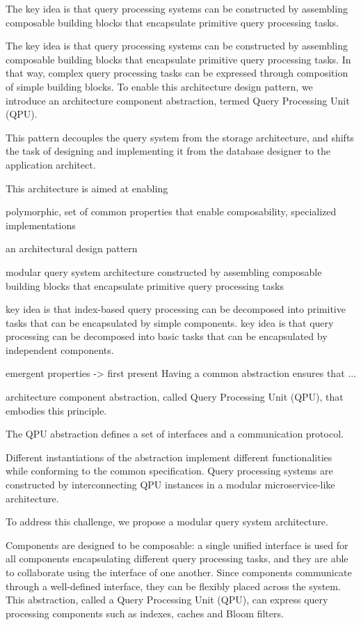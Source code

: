 The key idea is that query processing systems can be constructed by assembling composable building blocks that
encapsulate primitive query processing tasks.

The key idea is that query processing systems can be constructed by assembling composable building blocks that
encapsulate primitive query processing tasks.
In that way, complex query processing tasks can be expressed through composition of simple building blocks.
To enable this architecture design pattern, we introduce an architecture component abstraction, termed Query Processing
Unit (QPU).




This pattern decouples the query system from the storage architecture,
and shifts the task of designing and implementing it from the database designer to the application architect.

This architecture is aimed at enabling

polymorphic, set of common properties that enable composability, specialized implementations


an architectural design pattern

modular query system architecture
constructed by assembling composable building blocks that encapsulate primitive query processing tasks


key idea is that index-based query processing can be decomposed into primitive tasks that can be encapsulated by simple components.
key idea is that query processing can be decomposed into basic tasks that can be encapsulated by independent components.

emergent properties -> first present
Having a common abstraction ensures that ...

architecture component abstraction, called Query Processing Unit (QPU), that embodies this principle.

The QPU abstraction defines a set of interfaces and a communication protocol.

Different instantiations of the abstraction implement different functionalities while conforming to the common specification.
Query processing systems are constructed by interconnecting QPU instances in a modular microservice-like architecture.

To address this challenge, we propose a modular query system architecture.


Components are designed to be composable:
a single unified interface is used for all components encapsulating different query processing tasks, and they are able to collaborate using the interface of one another.
Since components communicate through a well-defined interface, they can be flexibly placed across the system.
This abstraction, called a Query Processing Unit (QPU), can express query processing components such as indexes, caches and Bloom filters.

